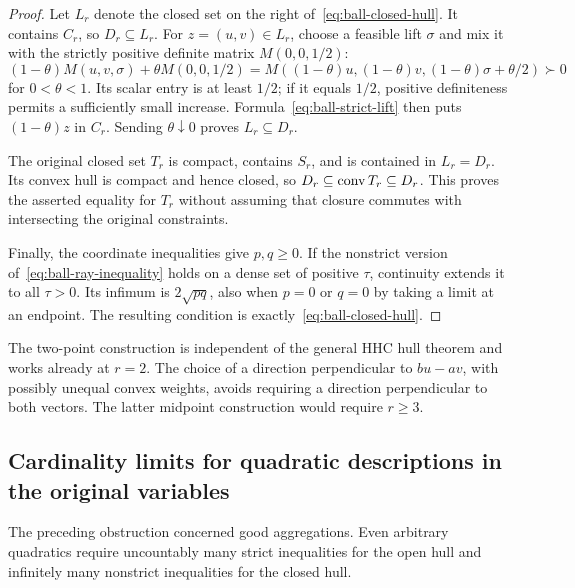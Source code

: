 \begin{proof}
Let $L_r$ denote the closed set on the right
of~\eqref{eq:ball-closed-hull}. It contains $C_r$, so $D_r\subseteq L_r$.
For $z=(u,v)\in L_r$, choose a feasible lift $\sigma$ and mix it
with the strictly positive definite matrix $M(0,0,1/2)$:
\[
 (1-\theta)M(u,v,\sigma)+\theta M(0,0,1/2)
 =M((1-\theta)u,(1-\theta)v,(1-\theta)\sigma+\theta/2)
 \succ0
\]
for $0<\theta<1$. Its scalar entry is at least $1/2$; if it
equals $1/2$, positive definiteness permits a sufficiently small
increase. Formula~\eqref{eq:ball-strict-lift} then puts
$(1-\theta)z$ in $C_r$. Sending $\theta\downarrow0$ proves
$L_r\subseteq D_r$.

The original closed set $T_r$ is compact, contains $S_r$, and
is contained in $L_r=D_r$. Its convex hull is compact and hence
closed, so
$D_r\subseteq\operatorname{conv} T_r\subseteq D_r$. This proves the asserted
equality for $T_r$ without assuming that closure commutes with
intersecting the original constraints.

Finally, the coordinate inequalities give $p,q\geq0$.
If the nonstrict version of~\eqref{eq:ball-ray-inequality} holds
on a dense set of positive $\tau$, continuity extends it to all
$\tau>0$. Its infimum is $2\sqrt{pq}$, also when $p=0$ or $q=0$
by taking a limit at an endpoint. The resulting condition is
exactly~\eqref{eq:ball-closed-hull}.
\end{proof}

The two-point construction is independent of the general HHC hull theorem
and works already at $r=2$. The choice of a direction perpendicular to
$bu-av$, with possibly unequal convex weights, avoids requiring a direction
perpendicular to both vectors. The latter midpoint construction would
require $r\geq3$.

\subsection{Cardinality limits for quadratic descriptions in the original variables}

The preceding obstruction concerned good aggregations. Even arbitrary
quadratics require uncountably many strict inequalities for the open
hull and infinitely many nonstrict inequalities for the closed hull.

